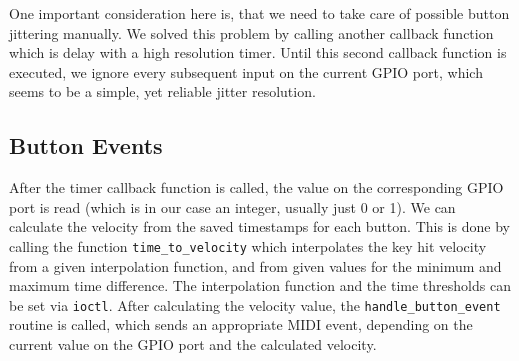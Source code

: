 \documentclass[paper=a4,fontsize=11pt,twocolumn,pagesize,bibtotoc]{scrartcl}
\begin{document}
One important consideration here is, that we need to take care of possible 
button jittering manually. We solved this problem by calling another callback
function which is delay with a high resolution timer. Until this second 
callback function is executed, we ignore every subsequent input on the 
current GPIO port, which seems to be a simple, yet reliable jitter resolution.

\subsection{Button Events}
\label{gpios:buttonevents}

After the timer callback function is called, the value on the corresponding 
GPIO port is read (which is in our case an integer, usually just 0 or 1).
We can calculate the velocity from the saved timestamps for each button.
This is done by calling the function \texttt{time\_to\_velocity} which
interpolates the key hit velocity from a given interpolation function, and from
given values for the minimum and maximum time difference. The interpolation function 
and the time thresholds can be set via \texttt{ioctl}.
After calculating the velocity value, the \texttt{handle\_button\_event}
routine is called, which sends an appropriate MIDI event, depending on the 
current value on the GPIO port and the calculated velocity.
\end{document}
